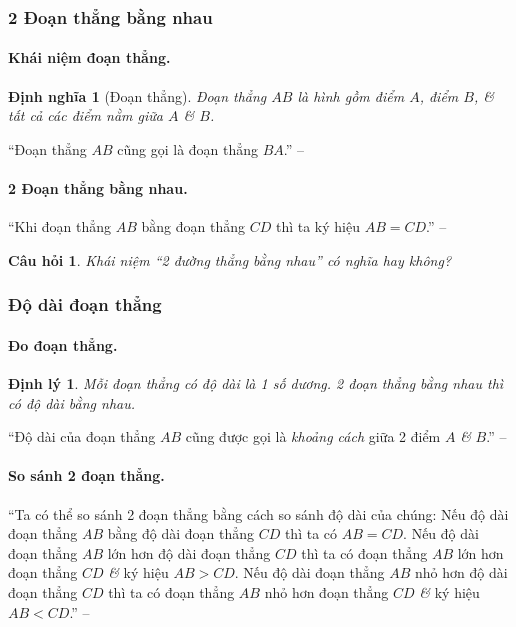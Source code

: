 \documentclass{article}
\numberwithin{equation}{section}
\newtheorem{definition}{Định nghĩa}[section]
\newtheorem{theorem}{Định lý}[section]
\newtheorem{question}{Câu hỏi}[section]
\begin{document}
\subsubsection{2 Đoạn thẳng bằng nhau}

\paragraph{Khái niệm đoạn thẳng.}
\begin{definition}[Đoạn thẳng]
	\emph{Đoạn thẳng $AB$} là hình gồm điểm $A$, điểm $B$, \textit{\&} tất cả các điểm nằm giữa $A$ \textit{\&} $B$.
\end{definition}
``Đoạn thẳng $AB$ cũng gọi là đoạn thẳng $BA$.'' -- \cite[p. 84]{Thai_Anh_Dat_Ha_Loan_Nam_Quang_Toan_6_tap_2}

\paragraph{2 Đoạn thẳng bằng nhau.} ``Khi đoạn thẳng $AB$ bằng đoạn thẳng $CD$ thì ta ký hiệu $AB = CD$.'' -- \cite[p. 85]{Thai_Anh_Dat_Ha_Loan_Nam_Quang_Toan_6_tap_2}

\begin{question}
	Khái niệm ``2 đường thẳng bằng nhau'' có nghĩa hay không?
\end{question}

\subsubsection{Độ dài đoạn thẳng}

\paragraph{Đo đoạn thẳng.}
\begin{theorem}
	Mỗi đoạn thẳng có độ dài là 1 số dương. 2 đoạn thẳng bằng nhau thì có độ dài bằng nhau.
\end{theorem}
``Độ dài của đoạn thẳng $AB$ cũng được gọi là \textit{khoảng cách} giữa 2 điểm $A$ \textit{\&} $B$.'' -- \cite[p. 85]{Thai_Anh_Dat_Ha_Loan_Nam_Quang_Toan_6_tap_2}

\paragraph{So sánh 2 đoạn thẳng.} ``Ta có thể so sánh 2 đoạn thẳng bằng cách so sánh độ dài của chúng: Nếu độ dài đoạn thẳng $AB$ bằng độ dài đoạn thẳng $CD$ thì ta có $AB = CD$. Nếu độ dài đoạn thẳng $AB$ lớn hơn độ dài đoạn thẳng $CD$ thì ta có đoạn thẳng $AB$ lớn hơn đoạn thẳng $CD$ \textit{\&} ký hiệu $AB > CD$. Nếu độ dài đoạn thẳng $AB$ nhỏ hơn độ dài đoạn thẳng $CD$ thì ta có đoạn thẳng $AB$ nhỏ hơn đoạn thẳng $CD$ \textit{\&} ký hiệu $AB < CD$.'' -- \cite[p. 86]{Thai_Anh_Dat_Ha_Loan_Nam_Quang_Toan_6_tap_2}
\end{document}
